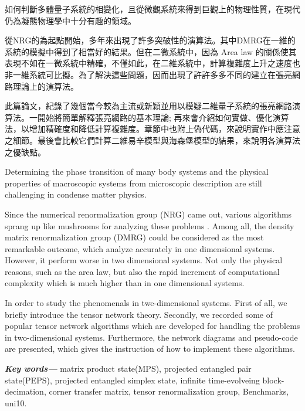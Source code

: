 \providecommand{\keywords}[1]{\textbf{\textit{Key words---}} #1}

\begin{abstractzh}
如何判斷多體量子系統的相變化，且從微觀系統來得到巨觀上的物理性質，在現代仍為凝態物理學中十分有趣的領域。

從NRG的為起點開始，多年來出現了許多突破性的演算法。其中DMRG在一維的系統的模擬中得到了相當好的結果。但在二微系統中，因為 Area law 的關係使其表現不如在一微系統中精確，不僅如此，在二維系統中，計算複雜度上升之速度也非一維系統可比擬。為了解決這些問題，因而出現了許許多多不同的建立在張亮網路理論上的演算法。

此篇論文，紀錄了幾個當今較為主流或新穎並用以模疑二維量子系統的張亮網路演算法。一開始將簡單解釋張亮網路的基本理論; 再來會介紹如何實做、優化演算法，以增加精確度和降低計算複雜度。章節中也附上偽代碼，來說明實作中應注意之細節。最後會比較它們計算二維易辛模型與海森堡模型的結果，來說明各演算法之優缺點。

\end{abstractzh}

\begin{abstracten}
  Determining the phase transition of many body systems and the physical properties of macroscopic systems from microscopic description are still challenging in condense matter physics.

  Since the numerical renormalization group (NRG) came out, various algorithms sprang up like mushrooms for analyzing these problems . Among all, the density matrix renormalization group (DMRG) could be considered as the most remarkable outcome, which analyze accurately in one dimensional systems. However, it perform worse in two dimensional systems. Not only the physical reasons, such as the area law, but also the rapid increment of computational complexity which is much higher than in one dimensional systems.
  
  In order to study the phenomenals in twe-dimensional systems. First of all, we briefly introduce the tensor network theory. Secondly, we recorded some of popular tensor network algorithms which are developed for handling the problems in two-dimensional systems. Furthermore, the network diagrams and pseudo-code are presented, which gives the instruction of how to implement these algorithms.

\end{abstracten}

\keywords{matrix product state(MPS), projected entangled pair state(PEPS), projected entangled simplex state, infinite time-evolveing block-decimation, corner transfer matrix, tensor renormalization group, Benchmarks, uni10.}

\begin{comment}
\category{I2.10}{Computing Methodologies}{Artificial Intelligence --
Vision and Scene Understanding} \category{H5.3}{Information
Systems}{Information Interfaces and Presentation (HCI) -- Web-based
Interaction.}

\terms{Design, Human factors, Performance.}
\end{comment}
